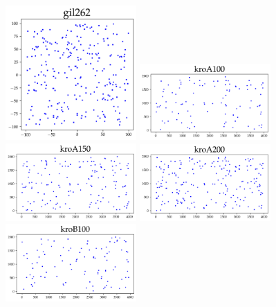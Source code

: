 \begin{appendices}
\begin{figure}[H]
\centering
\includegraphics[width=5cm]{../tsplib_euc2d_pictures_of_instances/gil262.png}
\includegraphics[width=5cm]{../tsplib_euc2d_pictures_of_instances/kroA100.png}
\includegraphics[width=5cm]{../tsplib_euc2d_pictures_of_instances/kroA150.png}
\includegraphics[width=5cm]{../tsplib_euc2d_pictures_of_instances/kroA200.png}
\includegraphics[width=5cm]{../tsplib_euc2d_pictures_of_instances/kroB100.png}
\end{figure}

\begin{figure}[H]
\centering


\end{figure}
\end{appendices}
